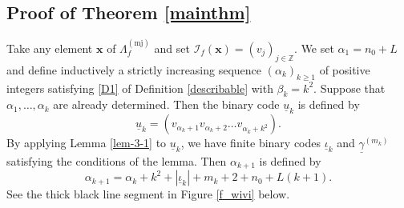 \documentclass{amsart}
\theoremstyle{plain}
\theoremstyle{definition}
\numberwithin{equation}{section}
\numberwithin{figure}{section}
\def\bx{{\boldsymbol{x}}}
\def\ul{\underline}
\begin{document}
\subsection{Proof of Theorem \ref{mainthm}}\label{ss_proof_thmA}

Take any element $\bx$ of $\Lambda_{f}^{(\mathrm{mj})}$ and 
set $\mathcal{I}_{f}(\bx)=(v_j)_{j\in \mathbb{Z}}$.
We  set $\alpha_1=n_0+L$ and define inductively a strictly increasing sequence $(\alpha _k)_{k\geq 1}$ of 
positive integers satisfying \eqref{D1} of Definition \ref{describable} with $\beta_k=k^2$.
Suppose that $\alpha_1,\dots,\alpha_k$  are already determined.
Then the binary code $\underline u_k$ is defined by
\begin{equation}\label{eqn_u_k}
\underline u_k=(v_{\alpha_k+1}v_{\alpha_k+2}\dots v_{\alpha_k+k^2}).
\end{equation}
By applying Lemma \ref{lem-3-1} to $\underline u_k$, 
we have finite binary codes $\ul\iota_k$ and $\ul\gamma^{(m_k)}$ 
satisfying the conditions of the lemma.
Then $\alpha_{k+1}$ is defined by 
\begin{equation}\label{eqn_alphak+1}
\alpha_{k+1}=\alpha_k+k^2+|\underline{\iota}_k|+m_k+2+n_0+L(k+1).
\end{equation}
See the thick black line segment in Figure \ref{f_wivi} below.
\end{document}
